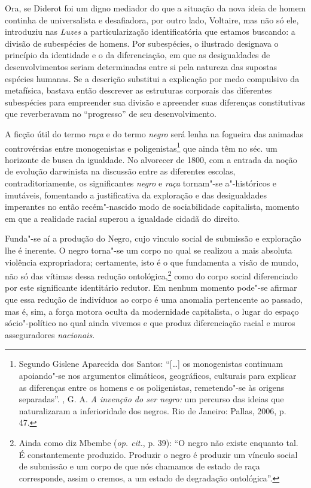 Ora, se Diderot foi um digno mediador do que a situação da nova ideia de
homem continha de universalista e desafiadora, por outro lado, Voltaire,
mas não só ele, introduziu nas \emph{Luzes} a particularização
identificatória que estamos buscando: a divisão de subespécies de
homens. Por subespécies, o ilustrado designava o princípio da identidade
e o da diferenciação, em que as desigualdades de desenvolvimentos seriam
determinadas entre si pela natureza das supostas espécies humanas. Se a
descrição substitui a explicação por medo compulsivo da metafísica,
bastava então descrever as estruturas corporais das diferentes
subespécies para empreender sua divisão e apreender suas diferenças
constitutivas que reverberavam no ``progresso'' de seu desenvolvimento.

A ficção útil do termo \emph{raça} e do termo \emph{negro} será lenha na
fogueira das animadas controvérsias entre monogenistas e
poligenistas\footnote{Segundo Gislene Aparecida dos Santos: ``[\ldots{}]
  os monogenistas continuam apoiando"-se nos argumentos climáticos,
  geográficos, culturais para explicar as diferenças entre os homens e
  os poligenistas, remetendo"-se às origens separadas''. , G. A.
  \emph{A invenção do ser negro:} um percurso das ideias que
  naturalizaram a inferioridade dos negros. Rio de Janeiro: Pallas,
  2006, p. 47.} que ainda têm no séc.  um horizonte de busca da
igualdade. No alvorecer de 1800, com a entrada da noção de evolução
darwinista na discussão entre as diferentes escolas, contraditoriamente,
os significantes \emph{negro} e \emph{raça} tornam"-se a"-históricos e
imutáveis, fomentando a justificativa da exploração e das desigualdades
imperantes no então recém"-nascido modo de sociabilidade capitalista,
momento em que a realidade racial superou a igualdade cidadã do direito.

Funda"-se aí a produção do Negro, cujo vinculo social de submissão e
exploração lhe é inerente. O negro torna"-se um corpo no qual se realizou
a mais absoluta violência expropriadora; certamente, isto é o que
fundamenta a visão de mundo, não só das vítimas dessa redução
ontológica,\footnote{Ainda como diz Mbembe (\emph{op. cit.}, p. 39): ``O negro
  não existe enquanto tal. É constantemente produzido. Produzir o negro
  é produzir um vínculo social de submissão e um corpo de que nós
  chamamos de estado de raça corresponde, assim o cremos, a um estado de
  degradação ontológica''.} como do corpo social diferenciado por
este significante identitário redutor. Em nenhum momento pode"-se afirmar
que essa redução de indivíduos ao corpo é uma anomalia pertencente ao
passado, mas é, sim, a força motora oculta da modernidade capitalista, o
lugar do espaço sócio"-político no qual ainda vivemos e que produz
diferenciação racial e muros asseguradores \emph{nacionais}.

